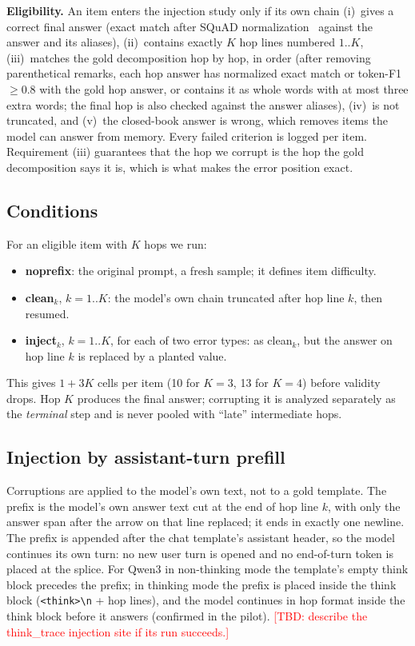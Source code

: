 \documentclass[conference]{IEEEtran}
\newcommand{\tbd}[1]{\textcolor{red}{[TBD: #1]}}
\begin{document}
\textbf{Eligibility.} An item enters the injection study only if its own chain (i)~gives a correct final answer (exact match after SQuAD normalization~\cite{squad} against the answer and its aliases), (ii)~contains exactly $K$ hop lines numbered $1..K$, (iii)~matches the gold decomposition hop by hop, in order (after removing parenthetical remarks, each hop answer has normalized exact match or token-F1 $\ge 0.8$ with the gold hop answer, or contains it as whole words with at most three extra words; the final hop is also checked against the answer aliases), (iv)~is not truncated, and (v)~the closed-book answer is wrong, which removes items the model can answer from memory. Every failed criterion is logged per item. Requirement (iii) guarantees that the hop we corrupt is the hop the gold decomposition says it is, which is what makes the error position exact.

\subsection{Conditions}
For an eligible item with $K$ hops we run:
\begin{itemize}
\item \textbf{noprefix}: the original prompt, a fresh sample; it defines item difficulty.
\item \textbf{clean$_k$}, $k=1..K$: the model's own chain truncated after hop line $k$, then resumed.
\item \textbf{inject$_k$}, $k=1..K$, for each of two error types: as clean$_k$, but the answer on hop line $k$ is replaced by a planted value.
\end{itemize}
This gives $1+3K$ cells per item (10 for $K{=}3$, 13 for $K{=}4$) before validity drops. Hop $K$ produces the final answer; corrupting it is analyzed separately as the \emph{terminal} step and is never pooled with ``late'' intermediate hops.

\subsection{Injection by assistant-turn prefill}
Corruptions are applied to the model's own text, not to a gold template. The prefix is the model's own answer text cut at the end of hop line $k$, with only the answer span after the arrow on that line replaced; it ends in exactly one newline. The prefix is appended after the chat template's assistant header, so the model continues its own turn: no new user turn is opened and no end-of-turn token is placed at the splice. For Qwen3 in non-thinking mode the template's empty think block precedes the prefix; in thinking mode the prefix is placed inside the think block (\texttt{<think>\textbackslash n} + hop lines), and the model continues in hop format inside the think block before it answers (confirmed in the pilot). \tbd{describe the think\_trace injection site if its run succeeds.}
\end{document}
